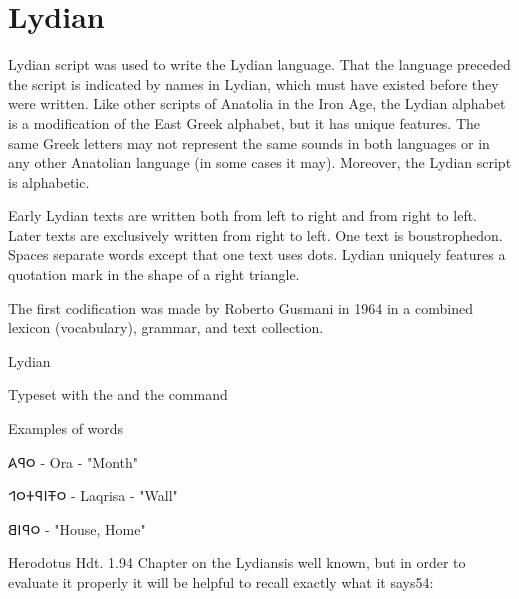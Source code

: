 

\section{Lydian}
 Lydian script was used to write the Lydian language. That the language preceded the script is indicated by names in Lydian, which must have existed before they were written. Like other scripts of Anatolia in the Iron Age, the Lydian alphabet is a modification of the East Greek alphabet, but it has unique features. The same Greek letters may not represent the same sounds in both languages or in any other Anatolian language (in some cases it may). Moreover, the Lydian script is alphabetic.



Early Lydian texts are written both from left to right and from right to left. Later texts are exclusively written from right to left. One text is boustrophedon. Spaces separate words except that one text uses dots. Lydian uniquely features a quotation mark in the shape of a right triangle.

The first codification was made by Roberto Gusmani in 1964 in a combined lexicon (vocabulary), grammar, and text collection.

\begin{scriptexample}[]{Lydian}

\medskip

Typeset with the  and the command \cmd{\lydian}
\end{scriptexample}

Examples of words

\bgroup\lydian
𐤬𐤭𐤠  - Ora - "Month"

𐤬𐤳𐤦𐤭𐤲𐤬𐤩  - Laqrisa - "Wall"

𐤬𐤭𐤦𐤡  - "House, Home"

\egroup

Herodotus Hdt. 1.94 
Chapter on the Lydiansis well known, but in order to evaluate it properly it will be
helpful to recall exactly what it says54:

